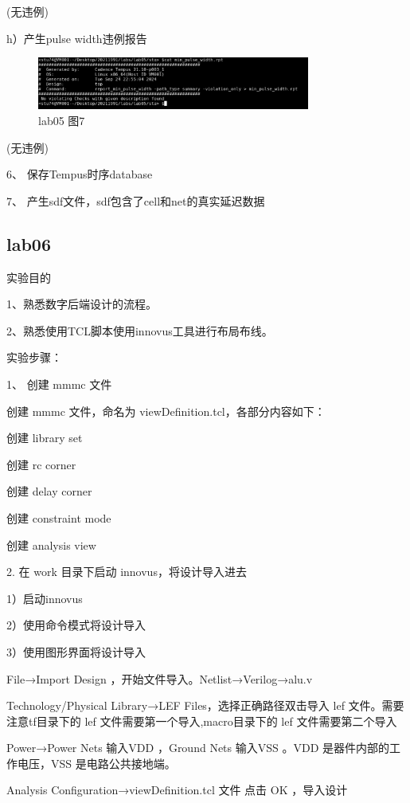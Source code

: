 (无违例)

h）产生pulse width违例报告

\begin{figure}[H]
    \centering
    \includegraphics[width=0.8\textwidth]{images/lab05-07.png}
    \caption{lab05 图7}
\end{figure}

(无违例)

6、	保存Tempus时序database
 
7、	产生sdf文件，sdf包含了cell和net的真实延迟数据

\subsection{lab06}

实验目的

1、熟悉数字后端设计的流程。

2、熟悉使用TCL脚本使用innovus工具进行布局布线。

实验步骤：

1、	创建 mmmc 文件

创建 mmmc 文件，命名为 viewDefinition.tcl，各部分内容如下：

创建 library set
 
创建 rc corner
 
创建 delay corner
 
创建 constraint mode
 
创建 analysis view
 
2. 在 work 目录下启动 innovus，将设计导入进去

1）启动innovus

2）使用命令模式将设计导入

3）使用图形界面将设计导入

File→Import Design ，开始文件导入。Netlist→Verilog→alu.v
 
Technology/Physical Library→LEF Files，选择正确路径双击导入 lef 文件。需要注意tf目录下的 lef 文件需要第一个导入,macro目录下的 lef 文件需要第二个导入
 
Power→Power Nets 输入VDD ，Ground Nets 输入VSS 。VDD 是器件内部的工作电压，VSS 是电路公共接地端。
 
Analysis Configuration→viewDefinition.tcl 文件 
点击 OK ，导入设计

